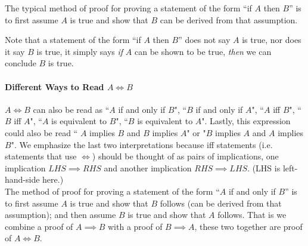 \noindent The typical method of proof for proving a statement of the form ``if $A$ then $B$'' is to first assume $A$ is true and show that $B$ can be derived from that assumption.

\noindent Note that a statement of the form ``if $A$ then $B$'' does not say $A$ is true, nor does it say $B$ is true, it simply says \textit{if} $A$ can be shown to be true, \textit{then} we can conclude $B$ is true. 




\paragraph{Different Ways to Read $A \iff B$}
$A\iff B$ can also be read as ``$A$ if and only if $B$", ``$B$ if and only if $A$", ``$A$ iff $B$", ``$B$ iff $A$", ``$A$ is equivalent to $B$", ``$B$ is equivalent to $A$". Lastly, this expression could also be read `` $A$ implies $B$ and $B$ implies $A$" or "$B$ implies $A$ and $A$ implies $B$". We emphasize the last two interpretations because iff statements (i.e. statements that use $\iff$) should be thought of as pairs of implications, one implication $LHS\implies RHS$ and another implication $RHS \implies LHS$. (LHS is left-hand-side here.)\\

\noindent The method of proof for proving a statement of the form ``$A$ if and only if $B$'' is to first assume $A$ is true and show that $B$ follows (can be derived from that assumption); and then assume $B$ is true and show that $A$ follows. That is we combine a proof of $A\implies B$ with a proof of $B \implies A$, these two together are proof of $A\iff B$.

